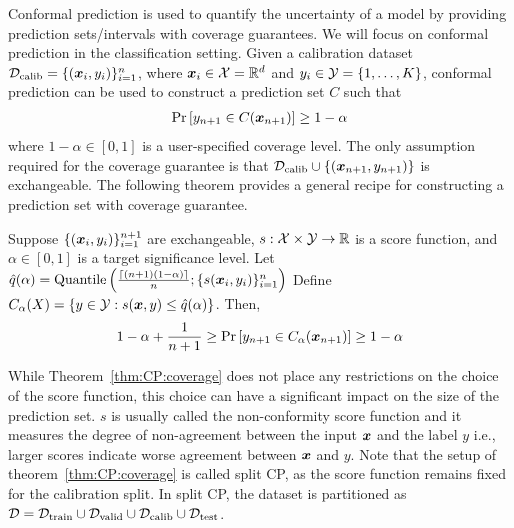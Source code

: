 Conformal prediction is used to quantify the uncertainty of a model by providing prediction sets/intervals with coverage guarantees.
We will focus on conformal prediction in the classification setting.
Given a calibration dataset ${\mathcal{D}}_{\text{calib}} = \{({\bm{x}}_i, y_i)\}_{i=1}^n$, where ${\bm{x}}_i \in {\mathcal{X}} = \mathbb{R}^d$ and $y_i \in {\mathcal{Y}} = \{1, \dots, K\}$, conformal prediction can be used to construct a prediction set $C$ such that
\begin{align*}
    \Pr\left[y_{n+1} \in C({\bm{x}}_{n+1}) \right] \geq 1 - \alpha
\end{align*}
where $1 - \alpha \in [0, 1]$ is a user-specified coverage level.
The only assumption required for the coverage guarantee is that ${\mathcal{D}}_{\text{calib}} \cup \{({\bm{x}}_{n+1}, y_{n+1})\}$ is exchangeable.
The following theorem provides a general recipe for constructing a prediction set with coverage guarantee.
\begin{theorem}
    Suppose $\{({\bm{x}}_i, y_i)\}_{i=1}^{n+1}$ are exchangeable, $s: {\mathcal{X}} \times {\mathcal{Y}} \rightarrow \mathbb{R}$ is a score function, and $\alpha \in [0, 1]$ is a target significance level.
    Let $\hat{q}(\alpha) = \text{Quantile}\left(\frac{\lceil(n+1)(1-\alpha)\rceil}{n}; \{s({\bm{x}}_i, y_i)\}_{i=1}^{n}\right)$
    Define $C_{\alpha}(X) = \{y \in {\mathcal{Y}}: s({\bm{x}}, y) \leq \hat{q}(\alpha)\}$.
    Then,
    \begin{align}
        1 - \alpha +\frac{1}{n+1} \geq \Pr\left[y_{n+1} \in C_{\alpha}({\bm{x}}_{n+1}) \right] \geq 1 - \alpha
        \label{eq:CP:coverage}
    \end{align}
    \label{thm:CP:coverage}
\end{theorem}

While Theorem~\ref{thm:CP:coverage} does not place any restrictions on the choice of the score function, this choice can have a significant impact on the size of the prediction set.
$s$ is usually called the non-conformity score function and it measures the degree of non-agreement between the input ${\bm{x}}$ and the label $y$ i.e., larger scores indicate worse agreement between ${\bm{x}}$ and $y$.
Note that the setup of theorem~\ref{thm:CP:coverage} is called split CP, as the score function remains fixed for the calibration split.
In split CP, the dataset is partitioned as $\mathcal{D} = {\mathcal{D}}_{\text{train}}\cup {\mathcal{D}}_{\text{valid}}\cup {\mathcal{D}}_{\text{calib}}\cup  {\mathcal{D}}_{\text{test}}$.

